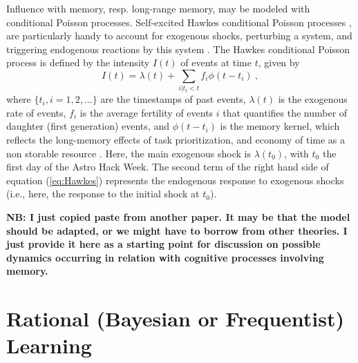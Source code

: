 \documentclass{article}
\begin{document}
Influence with memory, resp. long-range memory, may be modeled with conditional Poisson processes. Self-excited Hawkes conditional Poisson processes \cite{Hawkes_1974}, are particularly handy to account for exogenous shocks, perturbing a system, and triggering endogenous reactions by this system \cite{Crane_2008}. The Hawkes conditional Poisson process is defined by the intensity $I(t)$ of events at time $t$, given by
\begin{equation}
I(t)= \lambda(t) + \sum_{i | t_t<t}  f_i \phi(t-t_i)~,
\label{eq:Hawkes}
\end{equation}
where $\{t_i, i=1, 2, ...\}$ are the timestamps of past events, $\lambda(t)$ is the exogenous rate of events, $f_{i}$ is the average fertility of events $i$ that quantifies the number of daughter (first generation) events, and $ \phi(t-t_i)$ is the memory kernel, which reflects the long-memory effects of task prioritization, and economy of time as a non storable resource \cite{Maillart_2011}. Here, the main exogenous shock is $\lambda(t_{0})$, with $t_{0}$ the first day of the Astro Hack Week. The second term of the right hand side of equation (\ref{eq:Hawkes}) represents the endogenous response to exogenous shocks (i.e., here, the response to the initial shock at $t_{0}$). 

{\bf NB: I just copied paste from another paper. It may be that the model should be adapted, or we might have to borrow from other theories. I just provide it here as a starting point for discussion on possible dynamics occurring in relation with cognitive processes involving memory.}
  
  
  
  
  
  

\section{Rational (Bayesian or Frequentist) Learning}
\end{document}

